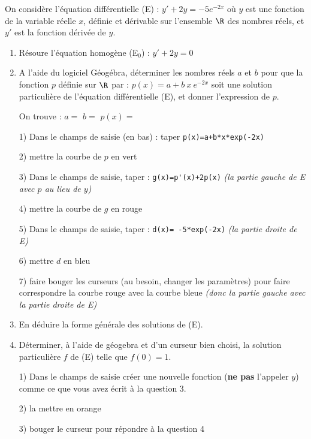 On considère l’équation différentielle (E) : $y' + 2y = -5e^{-2x}$ où $y$ est une fonction de la variable réelle $x$, définie et dérivable sur l’ensemble $\R$ des nombres réels, et $y'$ est la fonction dérivée de $y$.

\begin{enumerate}
	\item Résoure l'équation homogène (E$_0$) : $y'+2y=0$\sautp
	
	\item A l’aide du logiciel Géogébra, déterminer les nombres réels $a$ et $b$ pour que la fonction $p$ définie sur $\R$ par : $p(x) = a + b~x~e^{- 2x}$ soit une solution particulière de l'équation différentielle (E), et donner l’expression de $p$. \sautm
	
	On trouve : $a=$\makebox[0.1\linewidth]{\dotfill} \hfill $b=$\makebox[0.1\linewidth]{\dotfill} \hfill $p(x)=$\makebox[0.3\linewidth]{\dotfill}
	
	\begin{tcolorbox}[colback=darkWhite,colframe=black!50!white,arc=0mm,
	left=1mm,right=1mm,top=1mm,bottom=1mm,left skip=-0.65cm]
	1) Dans le champs de saisie (en bas) : taper \verb|p(x)=a+b*x*exp(-2x)|
	
	2) mettre la courbe de $p$ en vert
	
	3) Dans le champs de saisie, taper : \verb|g(x)=p'(x)+2p(x)| {\it \footnotesize (la partie gauche de E avec $p$ au lieu de $y$)}
	
	4) mettre la courbe de $g$ en rouge
	
	5) Dans le champs de saisie, taper : \verb|d(x)= -5*exp(-2x)| {\it \footnotesize (la partie droite de E)}
	
	6) mettre $d$ en bleu
	
	7) faire bouger les curseurs (au besoin, changer les paramètres) pour faire correspondre la courbe rouge avec la courbe bleue {\it \footnotesize (donc la partie gauche avec la partie droite de E)}
	\end{tcolorbox}
	\item En déduire la forme générale des solutions de (E).\sautp
	
	\item Déterminer, à l'aide de géogebra et d'un curseur bien choisi, la solution particulière $f$ de (E) telle que $f(0)=1$.\sautp
	
	
	\begin{tcolorbox}[colback=darkWhite,colframe=black!50!white,arc=0mm,
	left=1mm,right=1mm,top=1mm,bottom=1mm,left skip=-0.65cm]
	1) Dans le champs de saisie créer une nouvelle fonction ({\bf ne pas} l'appeler $y$) comme ce que vous avez écrit à la question 3.
	
	2) la mettre en orange	
	
	3) bouger le curseur pour répondre à la question 4
	\end{tcolorbox}
\end{enumerate}